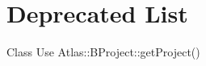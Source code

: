\chapter{Deprecated List}
\hypertarget{deprecated}{}\label{deprecated}

\begin{DoxyRefList}
\item[Class \doxylink{class_atlas_1_1_b_project_1_1_project_reference}{Atlas\+::BProject\+::Project\+Reference} ]\label{deprecated__deprecated000001}%
%
Use Atlas\+::\+BProject\+::get\+Project() 
\end{DoxyRefList}